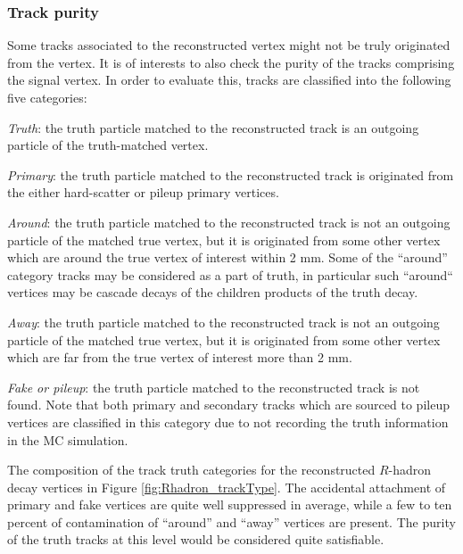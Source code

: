 \documentclass[NOTE, atlasdraft=true, texlive=2018, UKenglish]{\ATLASLATEXPATH atlasdoc}
\begin{document}
\subsubsection{Track purity}
Some tracks associated to the reconstructed vertex might not be truly originated from the vertex. It is of interests to also check the purity of the tracks comprising the signal vertex. In order to evaluate this, tracks are classified into the following five categories:
\begin{description}
\item {\emph{Truth}}: the truth particle matched to the reconstructed track is an outgoing particle of the truth-matched vertex.
\item {\emph{Primary}}: the truth particle matched to the reconstructed track is originated from the either hard-scatter or pileup primary vertices.
\item {\emph{Around}}: the truth particle matched to the reconstructed track is not an outgoing particle of the matched true vertex, but it is originated from some other vertex which are around the true vertex of interest within 2 mm. Some of the ``around'' category tracks may be considered as a part of truth, in particular such ``around`` vertices may be cascade decays of the children products of the truth decay.
\item {\emph{Away}}: the truth particle matched to the reconstructed track is not an outgoing particle of the matched true vertex, but it is originated from some other vertex which are far from the true vertex of interest more than 2 mm.
\item {\emph{Fake or pileup}}: the truth particle matched to the reconstructed track is not found. Note that both primary and secondary tracks which are sourced to pileup vertices are classified in this category due to not recording the truth information in the MC simulation.
\end{description}

The composition of the track truth categories for the reconstructed $R$-hadron decay vertices in Figure \ref{fig:Rhadron_trackType}. The accidental attachment of primary and fake vertices are quite well suppressed in average, while a few to ten percent of contamination of ``around'' and ``away'' vertices are present. The purity of the truth tracks at this level would be considered quite satisfiable.
\end{document}
